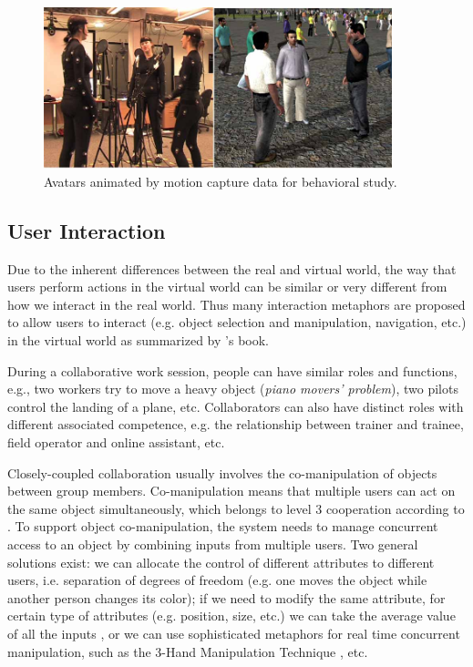 \begin{figure}[htb]
  \centering
  \includegraphics[width=0.9\textwidth]{figures/ch1/commu_study}
  \caption{\label{fig:1_commu} Avatars animated by motion capture data for behavioral study.}
\end{figure}

\subsection{User Interaction}
Due to the inherent differences between the real and virtual world, the way that users perform actions in the virtual world can be similar or very different from how we interact in the real world. Thus many interaction metaphors are proposed to allow users to interact (e.g. object selection and manipulation, navigation, etc.) in the virtual world as summarized by \citet{Bowman2004UIT}'s book.

During a collaborative work session, people can have similar roles and functions, e.g., two workers try to move a heavy object (\textit{piano movers' problem}), two pilots control the landing of a plane, etc. Collaborators can also have distinct roles with different associated competence, e.g. the relationship between trainer and trainee, field operator and online assistant, etc.

Closely-coupled collaboration usually involves the co-manipulation of objects between group members. Co-manipulation means that multiple users can act on the same object simultaneously, which belongs to level 3 cooperation according to \citet{Margery1999Framework}. To support object co-manipulation, the system needs to manage concurrent access to an object by combining inputs from multiple users. Two general solutions exist: we can allocate the control of different attributes to different users, i.e. separation of degrees of freedom \citep{Pinho2002Cooperative} (e.g. one moves the object while another person changes its color); if we need to modify the same attribute, for certain type of attributes (e.g. position, size, etc.) we can take the average value of all the inputs \citep{Ruddle2002Symmetric}, or we can use sophisticated metaphors for real time concurrent manipulation, such as the 3-Hand Manipulation Technique \citep{Aguerreche2009Three}, etc.

